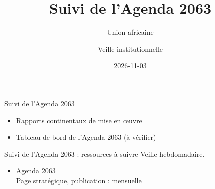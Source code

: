 \documentclass[aspectratio=169,11pt]{beamer}
\title{Suivi de l'Agenda 2063}
\subtitle{Union africaine}
\author{Veille institutionnelle}
\date{2026-11-03}
\begin{document}
\begin{frame}\titlepage\end{frame}

\begin{frame}{Suivi de l'Agenda 2063}
\begin{itemize}
\item Rapports continentaux de mise en œuvre
\item Tableau de bord de l'Agenda 2063 (à vérifier)
\end{itemize}
\end{frame}

\begin{frame}{Suivi de l'Agenda 2063 : ressources à suivre}
\small
Veille hebdomadaire.
\begin{itemize}
\item \href{https://au.int/en/agenda2063/overview}{Agenda 2063}\\{\footnotesize Page stratégique, publication : mensuelle}
\end{itemize}
\end{frame}
\end{document}
